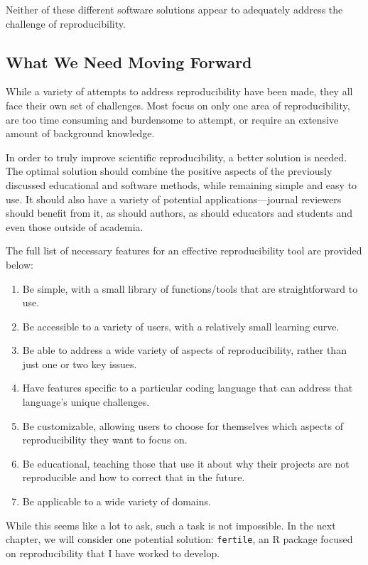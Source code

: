 \documentclass[12pt,twoside]{reedthesis}
\providecommand{\tightlist}{%
  \setlength{\itemsep}{0pt}\setlength{\parskip}{0pt}}
\begin{document}
Neither of these different software solutions appear to adequately address the challenge of reproducibility.

\hypertarget{what-we-need-moving-forward}{%
\subsection{What We Need Moving Forward}\label{what-we-need-moving-forward}}

While a variety of attempts to address reproducibility have been made, they all face their own set of challenges. Most focus on only one area of reproducibility, are too time consuming and burdensome to attempt, or require an extensive amount of background knowledge.

In order to truly improve scientific reproducibility, a better solution is needed. The optimal solution should combine the positive aspects of the previously discussed educational and software methods, while remaining simple and easy to use. It should also have a variety of potential applications---journal reviewers should benefit from it, as should authors, as should educators and students and even those outside of academia.

The full list of necessary features for an effective reproducibility tool are provided below:
\begin{enumerate}
\def\labelenumi{\arabic{enumi})}
\tightlist
\item
  Be simple, with a small library of functions/tools that are straightforward to use.
\item
  Be accessible to a variety of users, with a relatively small learning curve.
\item
  Be able to address a wide variety of aspects of reproducibility, rather than just one or two key issues.
\item
  Have features specific to a particular coding language that can address that language's unique challenges.
\item
  Be customizable, allowing users to choose for themselves which aspects of reproducibility they want to focus on.
\item
  Be educational, teaching those that use it about why their projects are not reproducible and how to correct that in the future.
\item
  Be applicable to a wide variety of domains.
\end{enumerate}
While this seems like a lot to ask, such a task is not impossible. In the next chapter, we will consider one potential solution: \texttt{fertile}, an R package focused on reproducibility that I have worked to develop.
\end{document}
